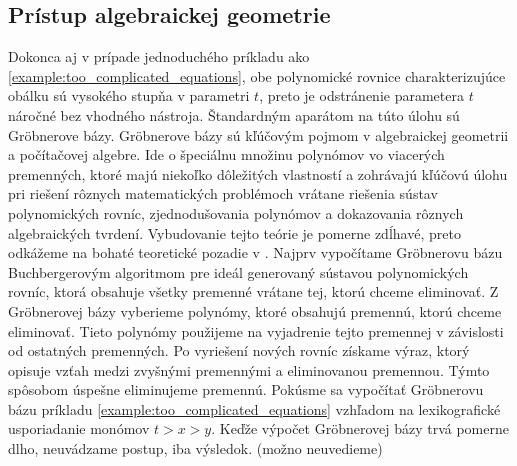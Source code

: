 \subsection{Prístup algebraickej geometrie}
Dokonca aj v prípade jednoduchého príkladu ako \ref{example:too_complicated_equations}, obe polynomické rovnice charakterizujúce obálku sú vysokého stupňa v parametri $t$, preto je odstránenie parametera $t$ náročné bez vhodného nástroja. Štandardným aparátom na túto úlohu sú Gröbnerove bázy. Gröbnerove bázy sú kľúčovým pojmom v algebraickej geometrii a počítačovej algebre. Ide o špeciálnu množinu polynómov vo viacerých premenných, ktoré majú niekoľko dôležitých vlastností a zohrávajú kľúčovú úlohu pri riešení rôznych matematických problémoch vrátane riešenia sústav polynomických rovníc, zjednodušovania polynómov a dokazovania rôznych algebraických tvrdení. Vybudovanie tejto teórie je pomerne zdĺhavé, preto odkážeme na bohaté teoretické pozadie v \cite{Chalm}.
Najprv vypočítame Gröbnerovu bázu Buchbergerovým algoritmom pre ideál generovaný sústavou polynomických rovníc, ktorá obsahuje všetky premenné vrátane tej, ktorú chceme eliminovať. Z Gröbnerovej bázy vyberieme polynómy, ktoré obsahujú premennú, ktorú chceme eliminovať. Tieto polynómy použijeme na vyjadrenie tejto premennej v závislosti od ostatných premenných. Po vyriešení nových rovníc získame výraz, ktorý opisuje vzťah medzi zvyšnými premennými a eliminovanou premennou. Týmto spôsobom úspešne eliminujeme premennú.
Pokúsme sa vypočítať Gröbnerovu bázu príkladu \ref{example:too_complicated_equations} vzhľadom na lexikografické usporiadanie monómov $t > x > y $. Keďže výpočet Gröbnerovej bázy trvá pomerne dlho, neuvádzame postup, iba výsledok. (možno neuvedieme)

